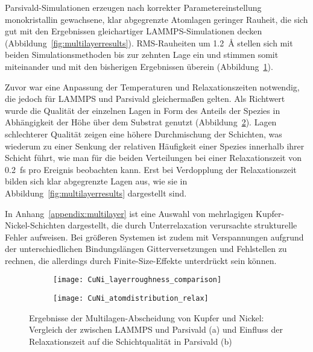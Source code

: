 Parsivald-Simulationen erzeugen nach korrekter Parametereinstellung monokristallin gewachsene, klar abgegrenzte Atomlagen geringer Rauheit, die sich gut mit den Ergebnissen gleichartiger LAMMPS-Simulationen decken (Abbildung~\ref{fig:multilayerresults}).
RMS-Rauheiten um \SI{1.2}{\angstrom} stellen sich mit beiden Simulationsmethoden bis zur zehnten Lage ein und stimmen somit miteinander und mit den bisherigen Ergebnissen überein (Abbildung~\ref{fig:multilayerplots-a}).

Zuvor war eine Anpassung der Temperaturen und Relaxationszeiten notwendig, die jedoch für LAMMPS und Parsivald gleichermaßen gelten.
Als Richtwert wurde die Qualität der einzelnen Lagen in Form des Anteils der Spezies in Abhängigkeit der Höhe über dem Substrat genutzt (Abbildung~\ref{fig:multilayerplots-b}).
Lagen schlechterer Qualität zeigen eine höhere Durchmischung der Schichten, was wiederum zu einer Senkung der relativen Häufigkeit einer Spezies innerhalb ihrer Schicht führt, wie man für die beiden Verteilungen bei einer Relaxationszeit von \SI{0.2}{\femto\second} pro Ereignis beobachten kann.
Erst bei Verdopplung der Relaxationszeit bilden sich klar abgegrenzte Lagen aus, wie sie in Abbildung~\ref{fig:multilayerresults} dargestellt sind.

In Anhang~\ref{appendix:multilayer} ist eine Auswahl von mehrlagigen Kupfer-Nickel-Schichten dargestellt, die durch Unterrelaxation verursachte strukturelle Fehler aufweisen.
Bei größeren Systemen ist zudem mit Verspannungen aufgrund der unterschiedlichen Bindungslängen Gitterversetzungen und Fehlstellen zu rechnen, die allerdings durch Finite-Size-Effekte unterdrückt sein können.

\begin{figure}
  \captionsetup[subfigure]{singlelinecheck=false}
  \def\subfigwidth{7cm}
  \begin{subfigure}[t]{\subfigwidth}
    \texttt{[image: CuNi\_layerroughness\_comparison]}
    \label{fig:multilayerplots-a}
  \end{subfigure}
  \hfill
  \begin{subfigure}[t]{\subfigwidth}
    \texttt{[image: CuNi\_atomdistribution\_relax]}
    \label{fig:multilayerplots-b}
  \end{subfigure}
  \caption[Ergebnisse der Multilagen-Abscheidung von Kupfer und Nickel]{
    Ergebnisse der Multilagen-Abscheidung von Kupfer und Nickel:
    Vergleich der zwischen LAMMPS und Parsivald (a) und Einfluss der Relaxationszeit auf die Schichtqualität in Parsivald (b)
  }
  \label{fig:multilayerplots}
\end{figure}

